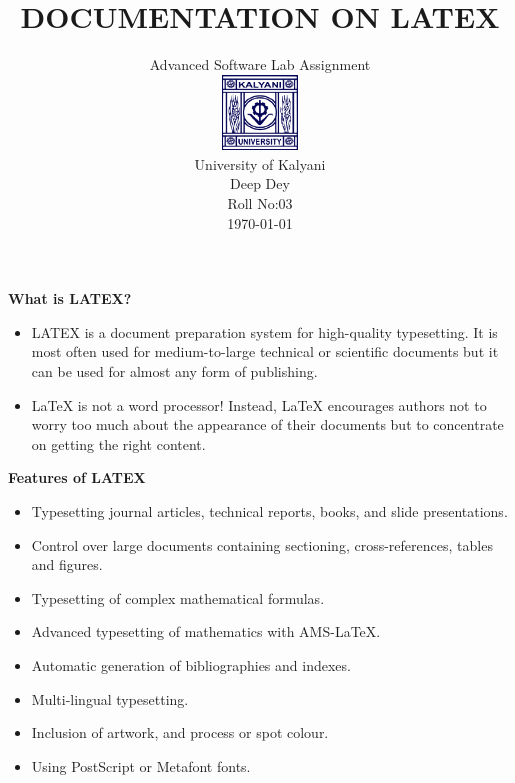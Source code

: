 \documentclass[12pt]{beamer}
\title{\textbf{DOCUMENTATION ON LATEX}}
\subtitle{Advanced Software Lab Assignment\\[10pt]\includegraphics[width=2cm]{img/logo.png}\\[5pt]
University of Kalyani\\[5pt]
Deep Dey\\[5pt] Roll No:03\\[5pt] \today}
\date{}
\begin{document}
\frame{\titlepage}

\begin{frame}[t]{\textbf{What is LATEX?}}
\begin{itemize}

\item LATEX is a document preparation system for high-quality typesetting. It is most often used for medium-to-large technical or scientific documents but it can be used for almost any form of publishing.

\item LaTeX is not a word processor! Instead, LaTeX encourages authors not to worry too much about the appearance of their documents but to concentrate on getting the right content. 

\end{itemize}
\end{frame}

\begin{frame}[t]{\textbf{Features of LATEX}}
\begin{itemize}
\item Typesetting journal articles, technical reports, books, and slide presentations.
\item Control over large documents containing sectioning, cross-references, tables and figures.
\item Typesetting of complex mathematical formulas.
\item Advanced typesetting of mathematics with AMS-LaTeX.
\item Automatic generation of bibliographies and indexes.
\item Multi-lingual typesetting.
\item Inclusion of artwork, and process or spot colour.
\item Using PostScript or Metafont fonts.
\end{itemize}
\end{frame}
\end{document}
